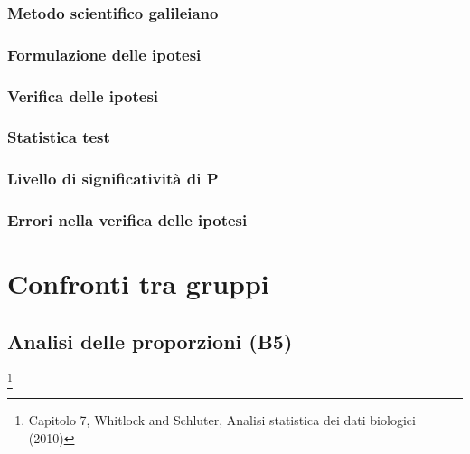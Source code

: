 \documentclass[drafts, 10pt]{book}
\begin{document}
\section{Metodo scientifico galileiano}

\section{Formulazione delle ipotesi}

\section{Verifica delle ipotesi}

\section{Statistica test}

\section{Livello di significatività di P}

\section{Errori nella verifica delle ipotesi}


\part{Confronti tra gruppi}


\chapter{Analisi delle proporzioni (B5)}\footnote{Capitolo 7, Whitlock and Schluter, Analisi statistica dei dati biologici (2010)}
\end{document}
